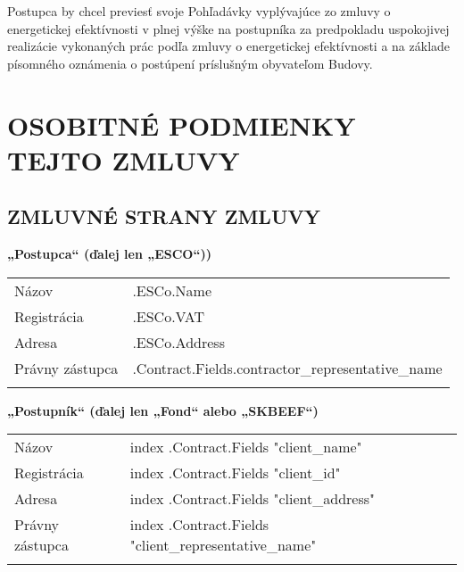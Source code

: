 \documentclass[a4paper]{article}
\begin{document}
Postupca by chcel previesť svoje Pohľadávky vyplývajúce zo zmluvy o energetickej efektívnosti v plnej výške na postupníka za predpokladu uspokojivej realizácie vykonaných prác podľa zmluvy o energetickej efektívnosti a na základe písomného oznámenia o postúpení príslušným obyvateľom Budovy.\par

\pagebreak

\renewcommand\thesection{}
\renewcommand\thesubsection{\arabic{subsection}}
\renewcommand\thesubsubsection{\thesubsection.\arabic{subsubsection}.}

\renewcommand*{\theenumi}{\thesubsection.\arabic{enumi}}
\renewcommand*{\theenumii}{\theenumi.\arabic{enumii}}

\section{OSOBITNÉ PODMIENKY TEJTO ZMLUVY}
\vspace{5mm}

\subsection{ZMLUVNÉ STRANY ZMLUVY}

\textbf{„Postupca“ (ďalej len „ESCO“))}

\vspace{2mm}

\begin{tabu}{|X|X[2]|} \tabucline{}
    Názov                  &{{.ESCo.Name}}                                          \\\tabucline{}
    Registrácia            &{{.ESCo.VAT}}                                           \\\tabucline{}
    Adresa                 &{{.ESCo.Address}}                                       \\\tabucline{}
    Právny zástupca        &{{.Contract.Fields.contractor_representative_name}}     \\\tabucline{}
\end{tabu}

\vspace{5mm}

\textbf{„Postupník“ (ďalej len „Fond“ alebo „SKBEEF“) }

\vspace{2mm}

\begin{tabu}{|X|X[2]|} \tabucline{}
  Názov            &{{index .Contract.Fields "client_name"}}                 \\\tabucline{}
  Registrácia            &{{index .Contract.Fields "client_id"}}                   \\\tabucline{}
  Adresa            &{{index .Contract.Fields "client_address"}}              \\\tabucline{}
  Právny zástupca   &{{index .Contract.Fields "client_representative_name"}}  \\\tabucline{}
\end{tabu}
\end{document}
